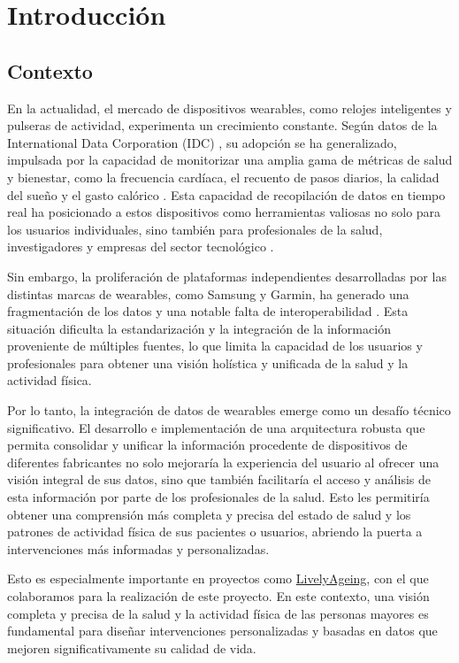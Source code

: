 \section{Introducción}

\subsection{Contexto}
En la actualidad, el mercado de dispositivos wearables, como relojes inteligentes y pulseras de actividad, experimenta un crecimiento constante. Según datos de la International Data Corporation (IDC) \cite{IDCWearables},  su adopción se ha generalizado, impulsada por la capacidad de monitorizar una amplia gama de métricas de salud y bienestar, como la frecuencia cardíaca, el recuento de pasos diarios, la calidad del sueño y el gasto calórico \cite{IDCWearables}.
Esta capacidad de recopilación de datos en tiempo real ha posicionado a estos dispositivos como herramientas valiosas no solo para los usuarios individuales, sino también para profesionales de la salud, investigadores y empresas del sector tecnológico \cite{ConsumerHealthWearables}.

Sin embargo, la proliferación de plataformas independientes desarrolladas por las distintas marcas de wearables, como Samsung y Garmin, ha generado una fragmentación de los datos y una notable falta de interoperabilidad \cite{serpush2022wearable}. Esta situación dificulta la estandarización y la integración de la información proveniente de múltiples fuentes, lo que limita la capacidad de los usuarios y profesionales para obtener una visión holística y unificada de la salud y la actividad física.

Por lo tanto, la integración de datos de wearables emerge como un desafío técnico significativo. El desarrollo e implementación de una arquitectura robusta que permita consolidar y unificar la información procedente de dispositivos de diferentes fabricantes no solo mejoraría la experiencia del usuario al ofrecer una visión integral de sus datos, sino que también facilitaría el acceso y análisis de esta información por parte de los profesionales de la salud. Esto les permitiría obtener una comprensión más completa y precisa del estado de salud y los patrones de actividad física de sus pacientes o usuarios, abriendo la puerta a intervenciones más informadas y personalizadas.

 

Esto es especialmente importante en proyectos como  \href{https://www.livelyageing.unimore.it/}{LivelyAgeing}, con el que colaboramos para la realización de este proyecto. En este contexto, una visión completa y precisa de la salud y la actividad física de las personas mayores es fundamental para diseñar intervenciones personalizadas y basadas en datos que mejoren significativamente su calidad de vida.

